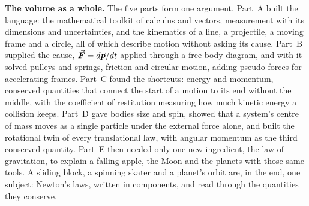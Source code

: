\medskip
\textbf{The volume as a whole.} The five parts form one argument. Part~A built the language: the
mathematical toolkit of calculus and vectors, measurement with its dimensions and uncertainties, and the
kinematics of a line, a projectile, a moving frame and a circle, all of which describe motion without
asking its cause. Part~B supplied the cause, $\vec{\bm{F}}=d\vec{\bm{p}}/dt$ applied through a free-body diagram, and with
it solved pulleys and springs, friction and circular motion, adding pseudo-forces for accelerating frames.
Part~C found the shortcuts: energy and momentum, conserved quantities that connect the start of a motion
to its end without the middle, with the coefficient of restitution measuring how much kinetic energy a
collision keeps. Part~D gave bodies size and spin, showed that a system's centre of mass moves as a single particle
under the external force alone, and built the rotational twin of every translational law, with angular momentum as the third
conserved quantity. Part~E then needed only one new ingredient, the law of gravitation, to explain a
falling apple, the Moon and the planets with those same tools. A sliding block, a spinning skater and a
planet's orbit are, in the end, one subject: Newton's laws, written in components, and read through the
quantities they conserve.
